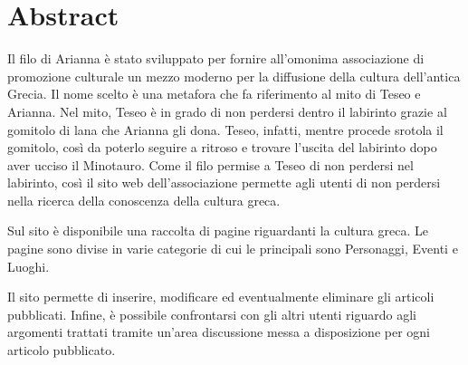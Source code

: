 \section*{Abstract}

Il filo di Arianna è stato sviluppato per fornire all'omonima associazione di promozione culturale un mezzo moderno per la diffusione della cultura dell'antica Grecia.
Il nome scelto è una metafora che fa riferimento al mito di Teseo e Arianna.
Nel mito, Teseo è in grado di non perdersi dentro il labirinto grazie al gomitolo di lana che Arianna gli dona. Teseo, infatti, mentre procede srotola il gomitolo, così da poterlo seguire a ritroso e trovare l'uscita del labirinto dopo aver ucciso il Minotauro.
Come il filo permise a Teseo di non perdersi nel labirinto, così il sito web dell'associazione permette agli utenti di non perdersi nella ricerca della conoscenza della cultura greca.

Sul sito è disponibile una raccolta di pagine riguardanti la cultura greca. 
Le pagine sono divise in varie categorie di cui le principali sono Personaggi, Eventi e Luoghi. 

Il sito permette di inserire, modificare ed eventualmente eliminare gli articoli pubblicati. Infine, è possibile confrontarsi con gli altri utenti riguardo agli argomenti trattati tramite un'area discussione messa a disposizione per ogni articolo pubblicato.
